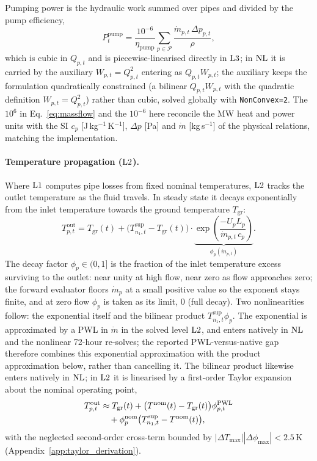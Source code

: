 Pumping power is the hydraulic work summed over pipes and divided by the pump efficiency,
%
\begin{equation}
  P_t^{\mathrm{pump}} = \frac{10^{-6}}{\eta_{\mathrm{pump}}}
    \sum_{p \in \mathcal{P}}
    \frac{\dot{m}_{p,t}\, \Delta p_{p,t}}{\rho},
  \label{eq:pump_power}
\end{equation}
%
which is cubic in $Q_{p,t}$ and is piecewise-linearised directly in $\mathrm{L3}$; in $\mathrm{NL}$
it is carried by the auxiliary $W_{p,t} = Q_{p,t}^2$ entering as $Q_{p,t} W_{p,t}$; the
auxiliary keeps the formulation quadratically constrained (a bilinear $Q_{p,t}W_{p,t}$ with the
quadratic definition $W_{p,t}=Q_{p,t}^2$) rather than cubic, solved globally with
\texttt{NonConvex=2}. The $10^{6}$ in
Eq.~\eqref{eq:massflow} and the $10^{-6}$ here reconcile the MW heat and power units with the
SI $c_p$ [J\,kg$^{-1}$\,K$^{-1}$], $\Delta p$ [Pa] and $\dot m$ [kg\,s$^{-1}$] of the physical
relations, matching the implementation.

\paragraph{Temperature propagation ($\mathrm{L2}$).}
Where $\mathrm{L1}$ computes pipe losses from fixed nominal temperatures, $\mathrm{L2}$ tracks the
outlet temperature as the fluid travels. In steady state it decays exponentially from the
inlet temperature towards the ground temperature $T_{\mathrm{gr}}$:
%
\begin{equation}
  T_{p,t}^{\mathrm{out}} = T_{\mathrm{gr}}(t)
    + \bigl(T_{n_1,t}^{\mathrm{sup}} - T_{\mathrm{gr}}(t)\bigr)
    \cdot \underbrace{\exp\!\left(
      \frac{-U_p L_p}{\dot{m}_{p,t}\, c_p}
    \right)}_{\displaystyle\phi_p(\dot{m}_{p,t})}.
  \label{eq:temp_prop}
\end{equation}
%
The decay factor $\phi_p \in (0,1]$ is the fraction of the inlet temperature excess
surviving to the outlet: near unity at high flow, near zero as flow approaches zero; the
forward evaluator floors $\dot{m}_p$ at a small positive value so the exponent stays finite,
and at zero flow $\phi_p$ is taken as its limit, $0$ (full decay). Two
nonlinearities follow: the exponential itself and the bilinear product
$T_{n_1,t}^{\mathrm{sup}} \phi_p$. The exponential is approximated by a PWL in $\dot{m}$ in the
solved level $\mathrm{L2}$, and enters natively in $\mathrm{NL}$ and the nonlinear 72-hour re-solves; the
reported PWL-versus-native gap therefore combines this exponential approximation with the
product approximation below, rather than cancelling it. The bilinear product likewise enters
natively in $\mathrm{NL}$; in $\mathrm{L2}$ it is linearised by a first-order Taylor expansion about the
nominal operating point,
%
\begin{align}
  T_{p,t}^{\mathrm{out}} &\approx T_{\mathrm{gr}}(t)
    + \bigl(T^{\mathrm{nom}}(t) - T_{\mathrm{gr}}(t)\bigr)
      \phi_{p,t}^{\mathrm{PWL}} \notag \\
    &\quad + \phi_p^{\mathrm{nom}}
      \bigl(T_{n_1,t}^{\mathrm{sup}} - T^{\mathrm{nom}}(t)\bigr),
  \label{eq:temp_prop_lin}
\end{align}
%
with the neglected second-order cross-term bounded by
$|\Delta T_{\max}||\Delta\phi_{\max}| < 2.5$\,K (Appendix~\ref{app:taylor_derivation}).

